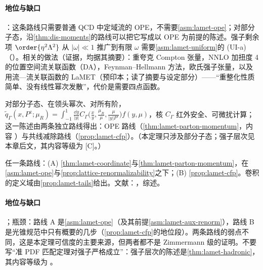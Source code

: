 \paragraph{地位与缺口}
\tagA：这条路线只需要普通 QCD 中定域流的 OPE，不需要\cref{asm:lamet-ope}；对部分子态，沿\cref{thm:dis-moments}的路线可以把它写成以 OPE 为前提的陈述。强子剩余项 $\order{\eta^2\Lambda^2}$ 从 $|\omega|\ll1$ 推广到有限 $\omega$ 需要\cref{asm:lamet-uniform}的 (UI-a)（\tagC）。相关的做法（证据，均据其摘要）：重夸克 Compton 张量\cite{DetmoldLin2006}，NNLO 加扭度 4 的位置空间流关联函数（DA）\cite{Braun:2007wv}，Feynman--Hellmann 方法\cite{ChambersEtAl2017}，欧氏强子张量\cite{Liu:1993cv}，以及用流—流关联函数的 LaMET\cite{Zhang:2026lle}（预印本；读了摘要与设定部分）——“重整化性质简单、没有线性幂次发散”，代价是需要四点函数。

\begin{theorem}\label{thm:lattice-lamet}
对部分子态、在领头幂次、对所有阶，$\tilde q_\Gamma(x,P^z;\mu_R)=\int_{-1}^1\frac{\dd y}{|y|}C_\Gamma\big(\frac xy,\frac{\mu_R}\mu,\frac\mu{|y|P^z}\big)f(y,\mu)$，核 $C_\Gamma$ 红外安全、可微扰计算；这一陈述由两条独立路线得出：OPE 路线（\cref{thm:lamet-parton-momentum}，内容 \tagA）与共线减除路线（\cref{prop:lamet-cfp}）。（本定理只涉及部分子态；强子层次见本章后文，其内容等级为 [C]。）
\end{theorem}

\begin{proofsketch}
任一条路线：(A) \cref{thm:lamet-coordinate}与\cref{thm:lamet-parton-momentum}，在\cref{asm:lamet-ope}与\cref{prop:lattice-renormalizability}之下；(B) \cref{prop:lamet-cfp}。卷积的定义域由\cref{prop:lamet-tails}给出。文献：\cite{IzubuchiEtAl2018,Ma:2014jla,MaQiu2018,JiEtAl2021}，综述\cite{Constantinou:2020hdm}。
\end{proofsketch}

\paragraph{地位与缺口}
\tagA；瓶颈：路线 A 是\cref{asm:lamet-ope}（及其前提\cref{asm:lamet-aux-renorm}），路线 B 是光锥规范中只有概要的几步（\cref{prop:lamet-cfp}的地位段）。两条路线的弱点不同，这是本定理可信度的主要来源，但两者都不是 Zimmermann 级的证明。不要写“准 PDF 匹配定理对强子严格成立”：强子层次的陈述是\cref{thm:lamet-hadronic}，其内容等级为 \tagC。

